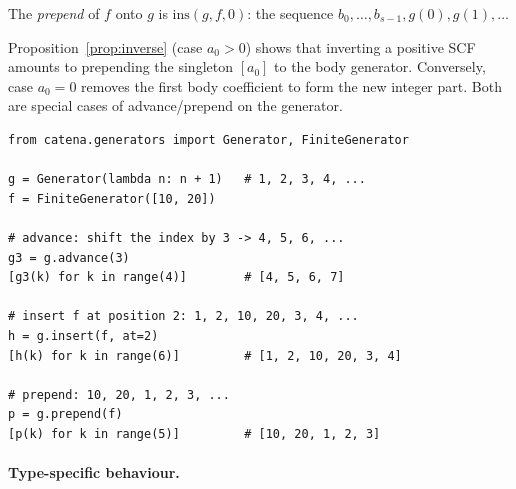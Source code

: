\begin{definition}[Prepend]
  \label{def:prepend}
  The \emph{prepend} of $f$ onto $g$ is $\mathrm{ins}(g, f, 0)$: the
  sequence $b_0, \ldots, b_{s-1}, g(0), g(1), \ldots$
\end{definition}

\begin{remark}
  Proposition~\ref{prop:inverse} (case $a_0 > 0$) shows that inverting
  a positive SCF amounts to prepending the singleton $[a_0]$ to the body
  generator.  Conversely, case $a_0 = 0$ removes the first body coefficient
  to form the new integer part.  Both are special cases of advance/prepend on
  the generator.
\end{remark}

\begin{catenadef}
\begin{lstlisting}[style=python]
from catena.generators import Generator, FiniteGenerator

g = Generator(lambda n: n + 1)   # 1, 2, 3, 4, ...
f = FiniteGenerator([10, 20])

# advance: shift the index by 3 -> 4, 5, 6, ...
g3 = g.advance(3)
[g3(k) for k in range(4)]        # [4, 5, 6, 7]

# insert f at position 2: 1, 2, 10, 20, 3, 4, ...
h = g.insert(f, at=2)
[h(k) for k in range(6)]         # [1, 2, 10, 20, 3, 4]

# prepend: 10, 20, 1, 2, 3, ...
p = g.prepend(f)
[p(k) for k in range(5)]         # [10, 20, 1, 2, 3]
\end{lstlisting}
\end{catenadef}

\paragraph{Type-specific behaviour.}

